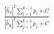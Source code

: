 \documentclass[preview]{standalone}
\begin{document}
\begin{align*}
\frac{\left|{\hat{h}_k}\right|^2\sum_{l=1}^{k-1}p_l+ C}{\left|{\hat{h}_k}\right|^2\sum_{j=1}^{k-1}p_j+ C}
\end{align*}
\end{document}
